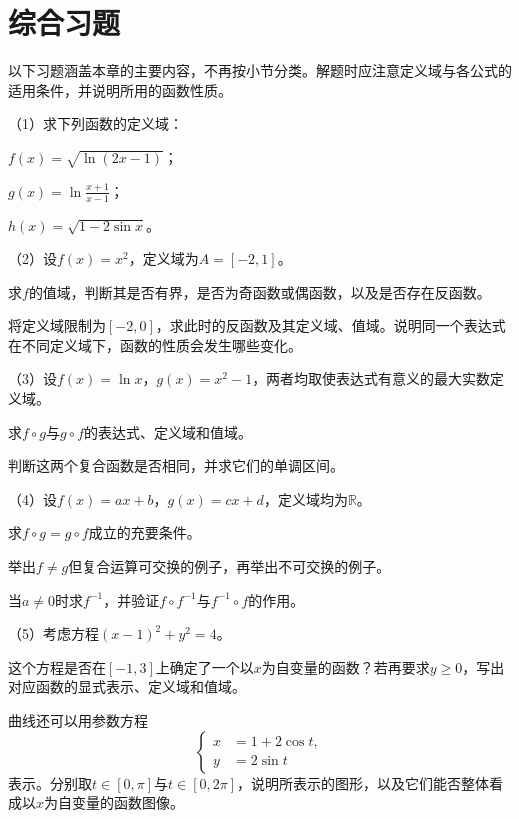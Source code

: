 \newpage
\section{综合习题}
以下习题涵盖本章的主要内容，不再按小节分类。解题时应注意定义域与各公式的适用条件，并说明所用的函数性质。

\begin{exercise}
\label{exs:functions-comprehensive}
\mbox{}\par\nobreak

（1）求下列函数的定义域：

\quad {}\(f(x) = \sqrt{\ln \left( 2 x - 1 \right)}\)；

\quad {}\(g(x) = \ln \frac{x + 1}{x - 1}\)；

\quad {}\(h(x) = \sqrt{1 - 2 \sin x}\)。

（2）设\(f(x) = x^{2}\)，定义域为\(A = [-2 , 1]\)。

\quad {}求\(f\)的值域，判断其是否有界，是否为奇函数或偶函数，以及是否存在反函数。

\quad {}将定义域限制为\([-2 , 0]\)，求此时的反函数及其定义域、值域。说明同一个表达式在不同定义域下，函数的性质会发生哪些变化。

（3）设\(f(x) = \ln x\)，\(g(x) = x^{2} - 1\)，两者均取使表达式有意义的最大实数定义域。

\quad {}求\(f \circ g\)与\(g \circ f\)的表达式、定义域和值域。

\quad {}判断这两个复合函数是否相同，并求它们的单调区间。

（4）设\(f(x) = a x + b\)，\(g(x) = c x + d\)，定义域均为\(\mathbb{R}\)。

\quad {}求\(f \circ g = g \circ f\)成立的充要条件。

\quad {}举出\(f \ne g\)但复合运算可交换的例子，再举出不可交换的例子。

\quad {}当\(a \ne 0\)时求\(f^{-1}\)，并验证\(f \circ f^{-1}\)与\(f^{-1} \circ f\)的作用。

（5）考虑方程\(\left( x - 1 \right)^{2} + y^{2} = 4\)。

\quad {}这个方程是否在\([-1 , 3]\)上确定了一个以\(x\)为自变量的函数？若再要求\(y \ge 0\)，写出对应函数的显式表示、定义域和值域。

\quad {}曲线还可以用参数方程
\begin{equation*}
    \left\{ \begin{aligned}
        x &= 1 + 2 \cos t , \\
        y &= 2 \sin t
    \end{aligned} \right.
\end{equation*}
表示。分别取\(t \in [0 , \pi]\)与\(t \in [0 , 2 \pi]\)，说明所表示的图形，以及它们能否整体看成以\(x\)为自变量的函数图像。


\end{exercise}
